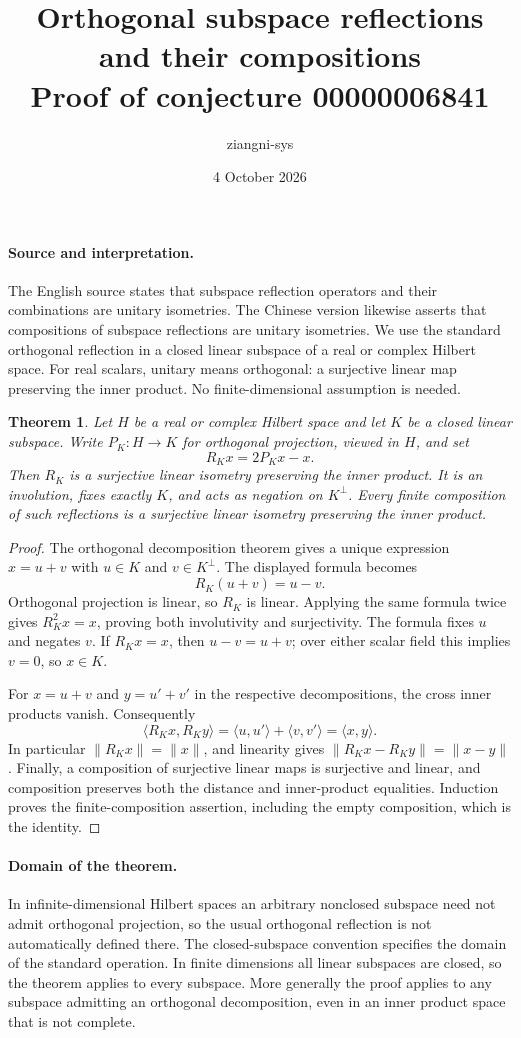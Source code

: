 \documentclass[11pt]{article}
\title{Orthogonal subspace reflections and their compositions\\Proof of conjecture 00000006841}
\author{ziangni-sys}
\date{4 October 2026}
\newtheorem{theorem}{Theorem}
\begin{document}
\maketitle
\paragraph{Source and interpretation.}
The English source states that subspace reflection operators and their combinations are unitary isometries. The Chinese version likewise asserts that compositions of subspace reflections are unitary isometries. We use the standard orthogonal reflection in a closed linear subspace of a real or complex Hilbert space. For real scalars, unitary means orthogonal: a surjective linear map preserving the inner product. No finite-dimensional assumption is needed.

\begin{theorem}
Let $H$ be a real or complex Hilbert space and let $K$ be a closed linear subspace. Write $P_K:H\to K$ for orthogonal projection, viewed in $H$, and set
\[
 R_K x=2P_Kx-x.
\]
Then $R_K$ is a surjective linear isometry preserving the inner product. It is an involution, fixes exactly $K$, and acts as negation on $K^\perp$. Every finite composition of such reflections is a surjective linear isometry preserving the inner product.
\end{theorem}
\begin{proof}
The orthogonal decomposition theorem gives a unique expression $x=u+v$ with $u\in K$ and $v\in K^\perp$. The displayed formula becomes
\[
 R_K(u+v)=u-v.
\]
Orthogonal projection is linear, so $R_K$ is linear. Applying the same formula twice gives $R_K^2x=x$, proving both involutivity and surjectivity. The formula fixes $u$ and negates $v$. If $R_Kx=x$, then $u-v=u+v$; over either scalar field this implies $v=0$, so $x\in K$.

For $x=u+v$ and $y=u'+v'$ in the respective decompositions, the cross inner products vanish. Consequently
\[
 \langle R_Kx,R_Ky\rangle
 =\langle u,u'\rangle+\langle v,v'\rangle
 =\langle x,y\rangle.
\]
In particular $\|R_Kx\|=\|x\|$, and linearity gives
$\|R_Kx-R_Ky\|=\|x-y\|$.
Finally, a composition of surjective linear maps is surjective and linear, and composition preserves both the distance and inner-product equalities. Induction proves the finite-composition assertion, including the empty composition, which is the identity.
\end{proof}

\newpage
\paragraph{Domain of the theorem.}
In infinite-dimensional Hilbert spaces an arbitrary nonclosed subspace need not admit orthogonal projection, so the usual orthogonal reflection is not automatically defined there. The closed-subspace convention specifies the domain of the standard operation. In finite dimensions all linear subspaces are closed, so the theorem applies to every subspace. More generally the proof applies to any subspace admitting an orthogonal decomposition, even in an inner product space that is not complete.
\end{document}
